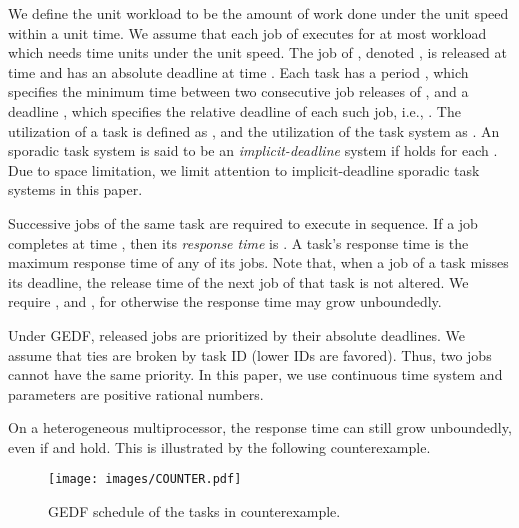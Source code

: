 \documentclass[Times, 10pt,twocolumn]{article}
\theoremstyle{definition}
\begin{document}
We define the unit workload to be the amount of work done under the unit speed within a unit time. We assume that each job of  executes for at most  workload which needs  time units under the unit speed. The  job of , denoted , is released at time  and has an absolute deadline at time .  Each task  has a period , which specifies the minimum time between two consecutive job releases of , and a deadline , which specifies the relative deadline of each such job, i.e., . The utilization of a task  is defined as , and the utilization of the task system  as . An sporadic task system  is said to be an \textit{implicit-deadline} system if  holds for each . Due to space limitation, we limit attention to implicit-deadline sporadic task systems in this paper.



\normalsize


Successive jobs of the same task are required to execute in sequence. If a job  completes at time , then its \textit{response time} is . A task's response time is the maximum response time of any of its jobs. Note that, when a job of a task misses its deadline, the release time of the next job of that task is not altered. We require , and , for otherwise the response time may grow unboundedly. 







Under GEDF, released jobs are prioritized by their absolute deadlines. We assume that ties are broken by task ID (lower IDs are favored). Thus, two jobs cannot have the same priority. In this paper, we use continuous time system and parameters are positive rational numbers.  

On a heterogeneous multiprocessor, the response time can still grow unboundedly, even if  and  hold. This is illustrated by the following counterexample.   

\begin{figure}[t]
	\begin{center}
	\texttt{[image: images/COUNTER.pdf]} 
	\end{center} 
\vspace{-5mm}
\caption{\small GEDF schedule of the tasks in counterexample.}
\vspace{-5mm}
\label{fig:counter}
\end{figure}
\end{document}
